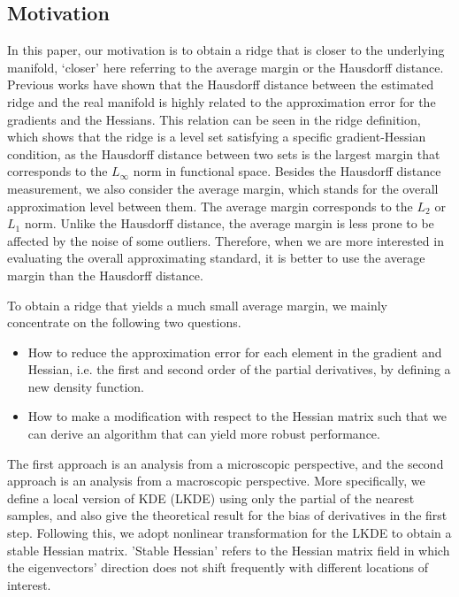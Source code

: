 \documentclass[aos,preprint]{imsart}
\theoremstyle{remark}
\begin{document}
\subsection{Motivation}
In this paper, our motivation is to obtain a ridge that is closer to the underlying manifold, `closer' here referring to the average margin or the Hausdorff distance. Previous works have shown that the Hausdorff distance between the estimated ridge and the real manifold is highly related to the approximation error for the gradients and the Hessians. This relation can be seen in the ridge definition, which shows that the ridge is a level set satisfying a specific gradient-Hessian condition, as the Hausdorff distance between two sets is the largest margin that corresponds to the $L_{\infty}$ norm in functional space. Besides the Hausdorff distance measurement, we also consider the average margin, which stands for the overall approximation level between them. The average margin corresponds to the $L_2$ or $L_1$ norm. Unlike the Hausdorff distance, the average margin is less prone to be affected by the noise of some outliers. Therefore, when we are more interested in evaluating the overall approximating standard, it is better to use the average margin than the Hausdorff distance.

To obtain a ridge that yields a much small average margin, we mainly concentrate on the following two questions.
\begin{itemize}
\item How to reduce the approximation error for each element in the gradient and Hessian, i.e. the first and second order of the partial derivatives, by defining a new density function.
\item How to make a modification with respect to the Hessian matrix such that we can derive an algorithm that can yield more robust performance.
\end{itemize}


The first approach is an analysis from a microscopic perspective, and the second approach is an analysis from a macroscopic perspective.
More specifically, we define a local version of KDE (LKDE) using only the partial of the nearest samples, and also give the theoretical result for the bias of derivatives in the first step. Following this, we adopt nonlinear transformation for the LKDE to obtain a stable Hessian matrix. 'Stable Hessian' refers to the Hessian matrix field in which the eigenvectors' direction does not shift frequently with different locations of interest.
\end{document}
